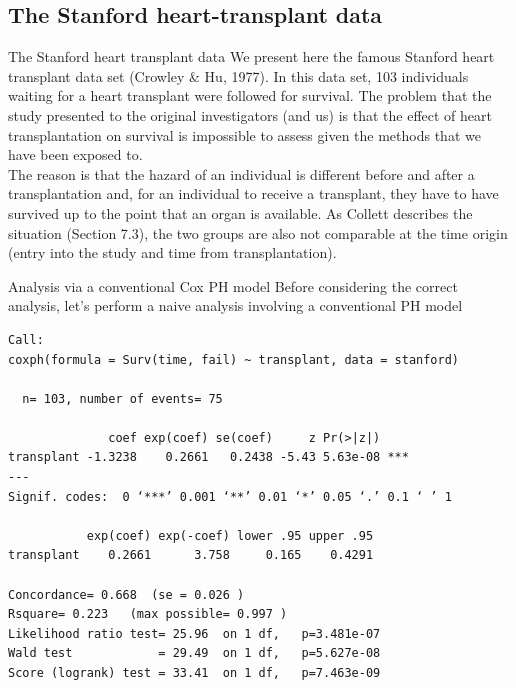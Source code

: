 \documentclass[envcountsect, 10pt, portrait, palatino]{beamer}
\begin{document}
\subsection{The Stanford heart-transplant data}
\begin{frame}{The Stanford heart transplant data}
We present here the famous Stanford heart transplant data set (Crowley \& Hu, 1977).  In this data set, 103 individuals waiting for a heart
transplant were followed for survival.  The problem that the study presented to the original investigators (and us) is that the effect of heart transplantation on survival is impossible to assess given the methods that we have been exposed to.
\\[2ex]
The reason is that the hazard of an individual is different before and after a transplantation and, for an individual to receive a transplant, they have to have survived up to the point that an organ is available.  As Collett describes the situation (Section 7.3), the two groups are also not comparable at the time origin (entry into the study and time from transplantation).
\end{frame} 
\begin{frame}[fragile]{Analysis via a conventional Cox PH model}
Before considering the correct analysis, let's perform a naive analysis involving a conventional PH model

\scriptsize
\begin{verbatim}
Call:
coxph(formula = Surv(time, fail) ~ transplant, data = stanford)

  n= 103, number of events= 75

              coef exp(coef) se(coef)     z Pr(>|z|)
transplant -1.3238    0.2661   0.2438 -5.43 5.63e-08 ***
---
Signif. codes:  0 ‘***’ 0.001 ‘**’ 0.01 ‘*’ 0.05 ‘.’ 0.1 ‘ ’ 1

           exp(coef) exp(-coef) lower .95 upper .95
transplant    0.2661      3.758     0.165    0.4291

Concordance= 0.668  (se = 0.026 )
Rsquare= 0.223   (max possible= 0.997 )
Likelihood ratio test= 25.96  on 1 df,   p=3.481e-07
Wald test            = 29.49  on 1 df,   p=5.627e-08
Score (logrank) test = 33.41  on 1 df,   p=7.463e-09
\end{verbatim}
\normalsize
\end{frame} 
\end{document}
